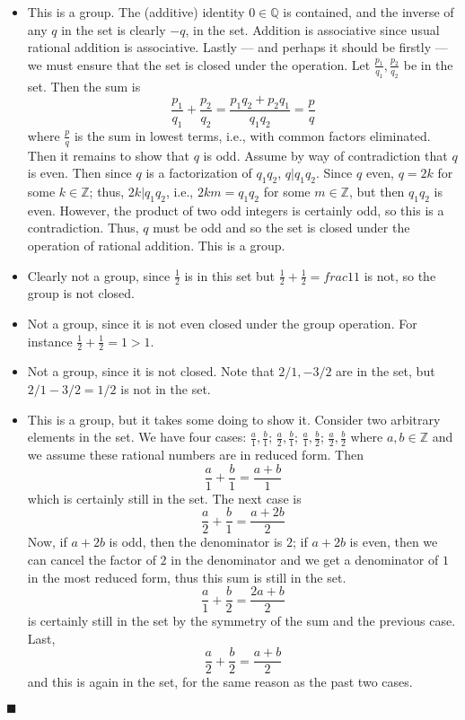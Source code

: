 \documentclass[12pt]{article}
\renewcommand{\qed}{\hfill$\blacksquare$}
\renewenvironment{proof}{\begin{addmargin}[1em]{0em}\begin{newproof}}{\end{newproof}\end{addmargin}\qed}
\begin{document}
\begin{proof}
\begin{itemize}
    \item This is a group. The (additive) identity $0\in \mathbb{Q}$ is contained, and the inverse of any $q$ in the set is clearly $-q$, in the set. Addition is associative since usual rational addition is associative. Lastly --- and perhaps it should be firstly --- we must ensure that the set is closed under the operation. Let $\frac{p_1}{q_1}, \frac{p_2}{q_2}$ be in the set. Then the sum is
    $$ \frac{p_1}{q_1}+\frac{p_2}{q_2} = \frac{p_1q_2+p_2q_1}{q_1q_2} = \frac{p}{q} $$ where $\frac{p}{q}$ is the sum in lowest terms, i.e., with common factors eliminated. Then it remains to show that $q$ is odd. Assume by way of contradiction that $q$ is even. Then since $q$ is a factorization of $q_1q_2$, $q|q_1q_2$. Since $q$ even, $q=2k$ for some $k\in \mathbb{Z}$; thus, $2k | q_1q_2$, i.e., $2km = q_1q_2$ for some $m\in \mathbb{Z}$, but then $q_1q_2$ is even. However, the product of two odd integers is certainly odd, so this is a contradiction. Thus, $q$ must be odd and so the set is closed under the operation of rational addition. This is a group.
    \item Clearly not a group, since $\frac{1}{2}$ is in this set but $\frac{1}{2}+\frac{1}{2}=frac{1}{1}$ is not, so the group is not closed.
    \item Not a group, since it is not even closed under the group operation. For instance $\frac{1}{2}+\frac{1}{2} = 1 > 1$.
    \item Not a group, since it is not closed. Note that $2/1,-3/2$ are in the set, but $2/1-3/2=1/2$ is not in the set.
    \item This is a group, but it takes some doing to show it. Consider two arbitrary elements in the set. We have four cases: $\frac{a}{1}, \frac{b}{1}$; $\frac{a}{2},\frac{b}{1}$; $\frac{a}{1},\frac{b}{2}$; $\frac{a}{2},\frac{b}{2}$ where $a,b \in \mathbb{Z}$ and we assume these rational numbers are in reduced form. Then
    $$ \frac{a}{1}+\frac{b}{1} = \frac{a+b}{1} $$ which is certainly still in the set. The next case is $$ \frac{a}{2}+\frac{b}{1} = \frac{a+2b}{2} $$ Now, if $a+2b$ is odd, then the denominator is $2$; if $a+2b$ is even, then we can cancel the factor of $2$ in the denominator and we get a denominator of $1$ in the most reduced form, thus this sum is still in the set. $$ \frac{a}{1}+\frac{b}{2} = \frac{2a+b}{2}$$ is certainly still in the set by the symmetry of the sum and the previous case. Last, $$\frac{a}{2}+\frac{b}{2}=\frac{a+b}{2}$$ and this is again in the set, for the same reason as the past two cases.

\end{itemize}
\end{proof}
\end{document}
